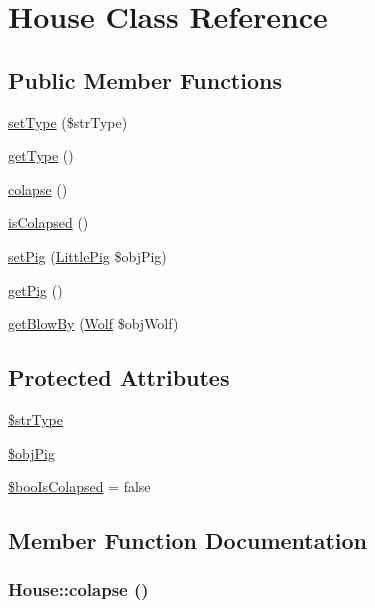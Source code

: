 \hypertarget{class_house}{
\section{House Class Reference}
\label{class_house}
}
\subsection*{Public Member Functions}
\begin{CompactItemize}
\item 
\hyperlink{class_house_f04781e06715dc18b8508aa711464239}{setType} (\$strType)
\item 
\hyperlink{class_house_5da805a230c3e1d39f42d30c81a3f5b3}{getType} ()
\item 
\hyperlink{class_house_9f0a5688b9788b4f3bd482c97d3edfe0}{colapse} ()
\item 
\hyperlink{class_house_b1156bf34e22cdd3f365f2fa05b0cc2a}{isColapsed} ()
\item 
\hyperlink{class_house_4e3e7de303a5afc31c94c64ba2ca01ed}{setPig} (\hyperlink{class_little_pig}{LittlePig} \$objPig)
\item 
\hyperlink{class_house_a497d8ab1b49d9fa1839acd685060b7f}{getPig} ()
\item 
\hyperlink{class_house_a2c980ac425350397d213cdfbda269e8}{getBlowBy} (\hyperlink{class_wolf}{Wolf} \$objWolf)
\end{CompactItemize}
\subsection*{Protected Attributes}
\begin{CompactItemize}
\item 
\hyperlink{class_house_81ebefceb0669e3fe446c4008c2a9a89}{\$strType}
\item 
\hyperlink{class_house_93c73a3dfd04bda657112823d0e7137e}{\$objPig}
\item 
\hyperlink{class_house_34fc64c5c784bbcaf81168f9d5e051c3}{\$booIsColapsed} = false
\end{CompactItemize}


\subsection{Member Function Documentation}
\hypertarget{class_house_9f0a5688b9788b4f3bd482c97d3edfe0}{
\subsubsection[{colapse}]{\setlength{\rightskip}{0pt plus 5cm}House::colapse ()}}
\label{class_house_9f0a5688b9788b4f3bd482c97d3edfe0}



